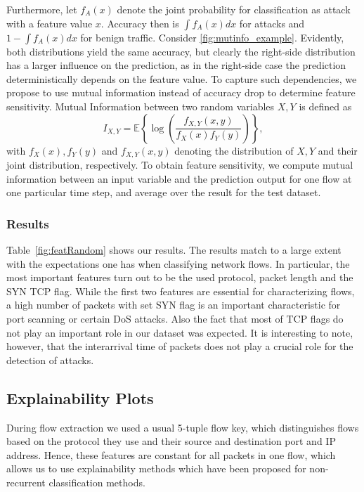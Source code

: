 \documentclass[conference]{IEEEtran}
\begin{document}
Furthermore, let $f_A(x)$  denote the joint probability for classification as attack with a feature value $x$. Accuracy then is $\int f_A(x) dx$ for attacks and $1-\int f_A(x) dx$ for benign traffic. Consider \autoref{fig:mutinfo_example}. Evidently, both distributions
yield the same accuracy, but clearly the right-side distribution has a larger influence on the prediction, as in the right-side case the prediction deterministically depends on the feature value.
To capture such dependencies, we propose to use mutual information instead of accuracy drop to determine feature sensitivity.
Mutual Information between two random variables $X,Y$ is defined as 
\begin{equation}
I_{X,Y} = \mathbb E \left\{ \log\left(\frac{f_{X,Y}(x,y)}{f_X(x)f_Y(y)}\right) \right\},
\end{equation}
with $f_X(x), f_Y(y)$ and $f_{X,Y}(x,y)$ denoting the distribution of $X,Y$ and their joint distribution, respectively. To obtain feature sensitivity, we compute mutual information between an input variable and the prediction output for one flow at one particular time step, and average over the result for the test dataset.

\subsubsection{Results}
Table~\ref{fig:featRandom} shows our results. The results match to a large extent with the expectations one has when classifying network flows. In particular, the most important features turn out to be the used protocol, packet length and the SYN TCP flag. While the first two features are essential for characterizing flows, a high number of packets with set SYN flag is an important characteristic for port scanning or certain DoS attacks. Also the fact that most of TCP flags do not play an important role in our dataset was expected. It is interesting to note, however, that the interarrival time of packets does not play a crucial role for the detection of attacks. 


\subsection{Explainability Plots}
During flow extraction we used a usual 5-tuple flow key, which distinguishes flows based on the protocol they use and their source and destination port and IP address. Hence, these features are constant for all packets in one flow, which allows us to use explainability methods which have been proposed for non-recurrent classification methods.
\end{document}

